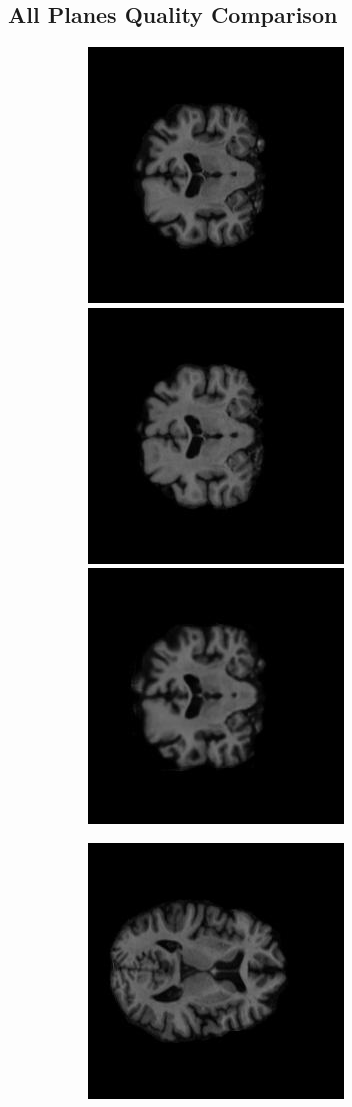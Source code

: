 \documentclass[12pt, fleqn, titlepage]{article}
\newcommand\skipperer{0.45pt}
\newcommand\ripperer{1.25pt}
\newcommand\bigskipx{2.1pt}
\newcommand{\1}[1]{\mathds{1}\left[#1\right]}
\begin{document}
\subsection{All Planes Quality Comparison}\label{all_generated}
\begin{figure}[H]
	\centering
	\begin{subfigure}[b]{0.7\textwidth}
		\centering
		\includegraphics[width=0.22\linewidth]{imgs/136_S_0196/136_S_0196_xy_3_GT}
		\hskip\skipperer
		\hskip\bigskipx
		\includegraphics[width=0.22\linewidth]{imgs/136_S_0196/136_S_0196_xy_1.5_GT}
		\hskip\skipperer
		\includegraphics[width=0.22\linewidth]{imgs/136_S_0196/ALL_model_136_S_0196_xy_3}
	\end{subfigure}
	\vskip\ripperer
	\begin{subfigure}[b]{0.7\textwidth}
		\centering
		\includegraphics[width=0.22\linewidth]{imgs/136_S_0196/136_S_0196_xz_3_GT}
		\hskip\skipperer
		\hskip\bigskipx

\end{subfigure}
\end{figure}
\end{document}
